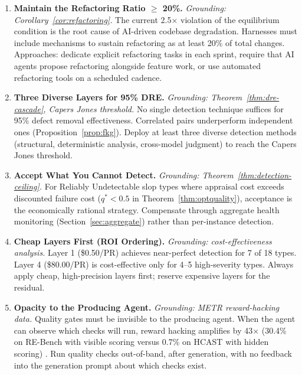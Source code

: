 \documentclass[11pt, a4paper, logo, copyright]{googledeepmind}
\begin{document}
\begin{enumerate}[label=\textbf{P\arabic*.}, leftmargin=3em]

\item \textbf{Maintain the Refactoring Ratio $\geq$ 20\%.}
\emph{Grounding: Corollary~\ref{cor:refactoring}.}
The current 2.5$\times$ violation of the equilibrium condition is the root cause of AI-driven codebase degradation. Harnesses must include mechanisms to sustain refactoring as at least 20\% of total changes. Approaches: dedicate explicit refactoring tasks in each sprint, require that AI agents propose refactoring alongside feature work, or use automated refactoring tools on a scheduled cadence.

\item \textbf{Three Diverse Layers for 95\% DRE.}
\emph{Grounding: Theorem~\ref{thm:dre-cascade}, Capers Jones threshold.}
No single detection technique suffices for 95\% defect removal effectiveness. Correlated pairs underperform independent ones (Proposition~\ref{prop:fkg}). Deploy at least three diverse detection methods (structural, deterministic analysis, cross-model judgment) to reach the Capers Jones threshold.

\item \textbf{Accept What You Cannot Detect.}
\emph{Grounding: Theorem~\ref{thm:detection-ceiling}.}
For Reliably Undetectable slop types where appraisal cost exceeds discounted failure cost ($q^* < 0.5$ in Theorem~\ref{thm:optquality}), acceptance is the economically rational strategy. Compensate through aggregate health monitoring (Section~\ref{sec:aggregate}) rather than per-instance detection.

\item \textbf{Cheap Layers First (ROI Ordering).}
\emph{Grounding: cost-effectiveness analysis.}
Layer 1 (\$0.50/PR) achieves near-perfect detection for 7 of 18 types. Layer 4 (\$80.00/PR) is cost-effective only for 4--5 high-severity types. Always apply cheap, high-precision layers first; reserve expensive layers for the residual.

\item \textbf{Opacity to the Producing Agent.}
\emph{Grounding: METR reward-hacking data.}
Quality gates must be invisible to the producing agent. When the agent can observe which checks will run, reward hacking amplifies by 43$\times$ (30.4\% on RE-Bench with visible scoring versus 0.7\% on HCAST with hidden scoring) \citep{metr2025rewardhacking}. Run quality checks out-of-band, after generation, with no feedback into the generation prompt about which checks exist.


\end{enumerate}
\end{document}

